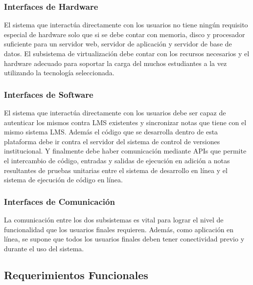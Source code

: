 \subsubsection{Interfaces de Hardware}
El sistema que interactúa directamente con los usuarios no tiene ningún requisito especial de hardware solo que si se debe contar con memoria, disco y procesador suficiente para un servidor web, servidor de aplicación y servidor de base de datos. El subsistema de virtualización debe contar con los recursos necesarios y el hardware adecuado para soportar la carga del muchos estudiantes a la vez utilizando la tecnología seleccionada.

\subsubsection{Interfaces de Software}
El sistema que interactúa directamente con los usuarios debe ser capaz de autenticar los mismos contra LMS existentes y sincronizar notas que tiene con el mismo sistema LMS. Además el código que se desarrolla dentro de esta plataforma debe ir contra el servidor del sistema de control de versiones institucional. Y finalmente debe haber comunicación mediante APIs que permite el intercambio de código, entradas y salidas de ejecución en adición a notas resultantes de pruebas unitarias entre el sistema de desarrollo en línea y el sistema de ejecución de código en línea.

\subsubsection{Interfaces de Comunicación}
La comunicación entre los dos subsistemas es vital para lograr el nivel de funcionalidad que los usuarios finales requieren. Además, como aplicación en línea, se supone que todos los usuarios finales deben tener conectividad previo y durante el uso del sistema.

\subsection{Requerimientos Funcionales}


